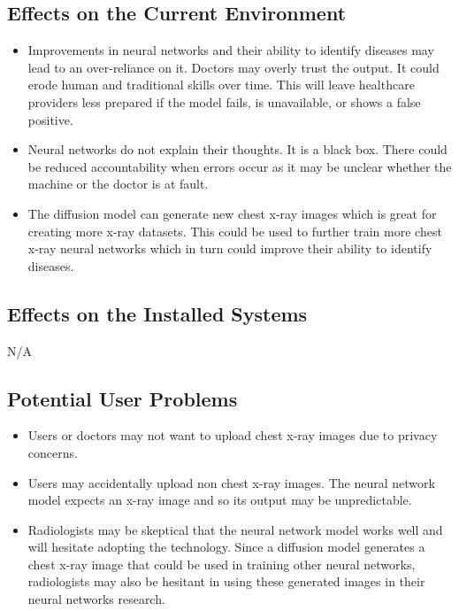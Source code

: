 \documentclass[12pt]{article}
\begin{document}
\subsection{Effects on the Current Environment}
\begin{itemize}
    \item Improvements in neural networks and their ability to identify diseases may lead to an 
    over-reliance on it. Doctors may overly trust the output. It could erode human and traditional 
    skills over time. This will leave healthcare providers less prepared if the model fails, is 
    unavailable, or shows a false positive.
    \item Neural networks do not explain their thoughts. It is a black box. There could be reduced 
    accountability when errors occur as it may be unclear whether the machine or the doctor is at 
    fault.
    \item The diffusion model can generate new chest x-ray images which is great for creating more 
    x-ray datasets. This could be used to further train more chest x-ray neural networks which in 
    turn could improve their ability to identify diseases.
\end{itemize}


\subsection{Effects on the Installed Systems}
N/A 

\subsection{Potential User Problems}
\begin{itemize}
    \item Users or doctors may not want to upload chest x-ray images due to privacy concerns.
    \item Users may accidentally upload non chest x-ray images. The neural network model expects 
    an x-ray image and so its output may be unpredictable.
    \item Radiologists may be skeptical that the neural network model works well and will hesitate 
    adopting the technology. Since a diffusion model generates a chest x-ray image that could be 
    used in training other neural networks, radiologists may also be hesitant in using these 
    generated images in their neural networks research.
\end{itemize}
\end{document}
